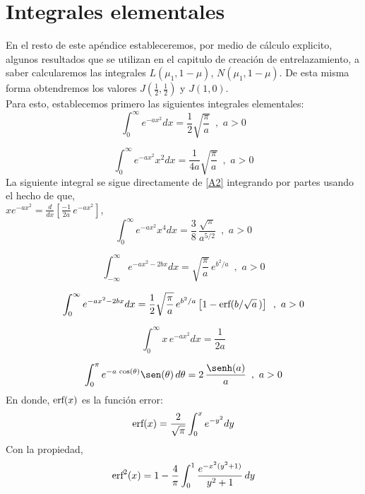 \documentclass[12pt]{book}
\numberwithin{equation}{chapter}
\def\t{\theta}
\def\erf{\hbox{erf}}
\begin{document}

\chapter{Integrales elementales}
En el resto de este ap\'endice estableceremos, por medio de c\'alculo explicito, algunos resultados que se utilizan en el capitulo de creaci\'on de entrelazamiento, a saber calcularemos las integrales $L(\mu_{1},1-\mu)$, $N(\mu_{1},1-\mu)$. De esta misma forma obtendremos los valores $J\left( \frac{1}{2} , \frac{1}{2} \right)$ y $J(1,0)$.\\
Para esto, establecemos primero las siguientes integrales elementales:
\begin{equation}\label{A1}
\int_{0}^{\infty} e^{-ax^{2}} dx =\frac{1}{2}\sqrt{\frac{\pi}{a}} \,\,\,,\,\, a>0
\end{equation}

\begin{equation}\label{A2}
\int_{0}^{\infty} e^{-ax^{2}} x^{2} dx= \frac{1}{4a}\sqrt{\frac{\pi}{a}} \,\,\,,\,\, a>0
\end{equation}
La siguiente integral se sigue directamente de \eqref{A2} integrando por partes usando el hecho de que,\\
$ x e^{-ax^{2}}= \frac{d}{dx} \left[ \frac{-1}{2a}\, e^{-ax^{2}} \right] $,
\begin{equation}\label{A2.1}
\int_{0}^{\infty} e^{-ax^{2}} x^{4} dx= \frac{3}{8}\, \frac{\sqrt{\pi}}{a^{5/2}} \,\,\,,\,\, a>0
\end{equation}

\begin{equation}\label{A3}
\int_{-\infty}^{\infty} e^{-ax^{2}-2bx} dx= \sqrt{\frac{\pi}{a}} \, e^{b^{2}/a} \,\,\,,\,\, a>0
\end{equation}

\begin{equation}\label{A4}
\int_{0}^{\infty} e^{-ax^{2}-2bx} dx= \frac{1}{2}\sqrt{\frac{\pi}{a}} \, e^{b^{2}/a} \left[ 1- \erf ( b/\sqrt{a}\, ) \right] \,\,\,,\,\, a>0
\end{equation}

\begin{equation}\label{A4.1}
\int_{0}^{\infty} x\, e^{-ax^{2}} dx= \frac{1}{2a}
\end{equation}

\begin{equation}\label{A8}
\int_{0}^{\pi} e^{-a \, \cos(\t)} \sen(\t) \, d\t= 2\,\frac{\senh(a)}{a} \,\,\,,\,\, a>0
\end{equation}
En donde, $\erf (x)$ es la funci\'on error:
\begin{equation}\label{erf}
\erf(x)= \frac{2}{\sqrt{\pi}} \int_{0}^{x} e^{-y^{2}} dy
\end{equation}
Con la propiedad,
\begin{equation}\label{erf-2}
\erf^{2}(x)= 1- \frac{4}{\pi} \int_{0}^{1} \frac{e^{-x^{2}(y^{2}+1)}}{y^{2}+1}\, dy
\end{equation}
\end{document}
